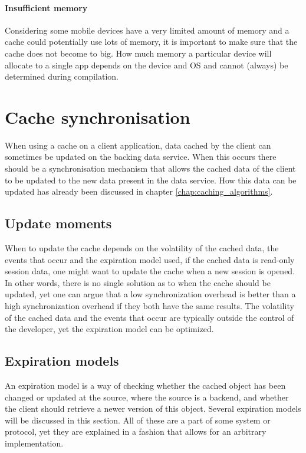 \documentclass[pdftex,a4paper,12pt,twoside]{report}
\begin{document}
\paragraph{Insufficient memory} Considering some mobile devices have a very limited amount of memory and a cache could potentially use lots of memory, it is important to make sure that the cache does not become to big. How much memory a particular device will allocate to a single app depends on the device and OS and cannot (always) be determined during compilation.
\section{Cache synchronisation}
When using a cache on a client application, data cached by the client can sometimes be updated on the backing data service. When this occurs there should be a synchronisation mechanism that allows the cached data of the client to be updated to the new data present in the data service. How this data can be updated has already been discussed in chapter \ref{chap:caching_algorithms}.
\subsection{Update moments}
When to update the cache depends on the volatility of the cached data, the events that occur and the expiration model used, if the cached data is read-only session data, one might want to update the cache when a new session is opened. In other words, there is no single solution as to when the cache should be updated, yet one can argue that a low synchronization overhead is better than a high synchronization overhead if they both have the same results. The volatility of the cached data and the events that occur are typically outside the control of the developer, yet the expiration model can be optimized.
\subsection{Expiration models}
An expiration model is a way of checking whether the cached object has been changed or updated at the source, where the source is a backend, and whether the client should retrieve a newer version of this object. Several expiration models will be discussed in this section. All of these are a part of some system or protocol, yet they are explained in a fashion that allows for an arbitrary implementation.
\end{document}
